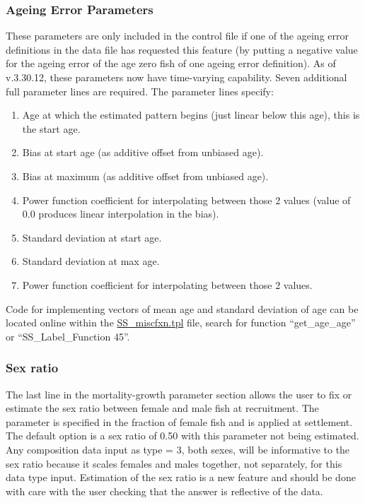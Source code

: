 \subsubsection{Ageing Error Parameters}
These parameters are only included in the control file if one of the ageing error definitions in the data file has requested this feature (by putting a negative value for the ageing error of the age zero fish of one ageing error definition). As of v.3.30.12, these parameters now have time-varying capability. Seven additional full parameter lines are required. The parameter lines specify:
\begin{enumerate}
	\item Age at which the estimated pattern begins (just linear below this age), this is the start age.
	\item Bias at start age (as additive offset from unbiased age).
	\item Bias at maximum (as additive offset from unbiased age).
	\item Power function coefficient for interpolating between those 2 values (value of 0.0 produces linear interpolation in the bias).
	\item Standard deviation at start age.
	\item Standard deviation at max age.
	\item Power function coefficient for interpolating between those 2 values.
\end{enumerate}

\noindent Code for implementing vectors of mean age and standard deviation of age can be located online within the \href{https://github.com/nmfs-ost/ss3-source-code/blob/main/SS_miscfxn.tpl}{SS\_miscfxn.tpl} file, search for function ``get\_age\_age'' or ``SS\_Label\_Function 45''.

\subsubsection{Sex ratio}
The last line in the mortality-growth parameter section allows the user to fix or estimate the sex ratio between female and male fish at recruitment. The parameter is specified in the fraction of female fish and is applied at settlement. The default option is a sex ratio of 0.50 with this parameter not being estimated. Any composition data input as type = 3, both sexes, will be informative to the sex ratio because it scales females and males together, not separately, for this data type input. Estimation of the sex ratio is a new feature and should be done with care with the user checking that the answer is reflective of the data.

